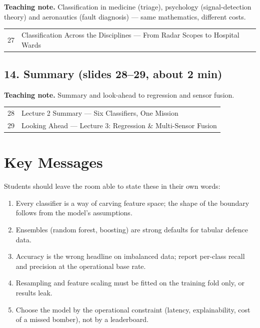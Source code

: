 \documentclass[11pt]{article}
\begin{document}
\textbf{Teaching note.} Classification in medicine (triage), psychology (signal-detection theory) and aeronautics (fault diagnosis) --- same mathematics, different costs.

\begin{center}\small\renewcommand{\arraystretch}{1.1}\begin{tabularx}{\textwidth}{@{}r X@{}}27 & Classification Across the Disciplines --- From Radar Scopes to Hospital Wards\\\end{tabularx}\end{center}

\subsection{14. Summary \normalfont\small\color{GreyN}(slides 28--29, about 2 min)}

\textbf{Teaching note.} Summary and look-ahead to regression and sensor fusion.

\begin{center}\small\renewcommand{\arraystretch}{1.1}\begin{tabularx}{\textwidth}{@{}r X@{}}28 & Lecture 2 Summary --- Six Classifiers, One Mission\\
29 & Looking Ahead --- Lecture 3: Regression \& Multi-Sensor Fusion\\\end{tabularx}\end{center}

\section{Key Messages}Students should leave the room able to state these in their own words:\begin{keypoint}\begin{enumerate}\item Every classifier is a way of carving feature space; the shape of the boundary follows from the model's assumptions.\item Ensembles (random forest, boosting) are strong defaults for tabular defence data.\item Accuracy is the wrong headline on imbalanced data; report per-class recall and precision at the operational base rate.\item Resampling and feature scaling must be fitted on the training fold only, or results leak.\item Choose the model by the operational constraint (latency, explainability, cost of a missed bomber), not by a leaderboard.\end{enumerate}\end{keypoint}
\end{document}
